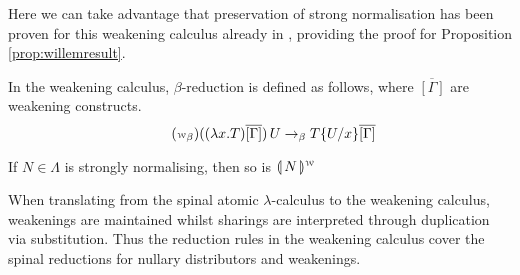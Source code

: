 \documentclass[a4paper,UKenglish,cleveref, autoref]{lipics-v2019}
\newcommand{\abs}[2]{\lambda #1 . #2}
\newcommand{\app}[2]{#1 \, #2}
\newcommand{\sub}[3]{#1 \{ #2 / #3 \}}
\newcommand{\weaksymbol}{\mbox{\tiny $\mathcal{W}$}}
\newcommand{\compweak}[1]{\llparenthesis \, #1 \, \rrparenthesis^{\weaksymbol}}
\begin{document}
\noindent Here we can take advantage that preservation of strong normalisation has been proven for this weakening calculus already in \cite{gundersen2013atomic}, providing the proof for Proposition \ref{prop:willemresult}. 
\begin{definition}
In the weakening calculus, $\beta$-reduction is defined as follows, where $\overline{[\Gamma]}$ are weakening constructs.
\begin{equation}
\tag{$\weaksymbol_{\beta}$}
	\app{((\abs{x}{T}) \overline{[\Gamma]})}{U} \rightarrow_{\beta} \sub{T}{U}{x} \overline{[\Gamma]} \\
\end{equation}
\end{definition}

\begin{proposition}
\label{prop:willemresult}
 If $N \in \Lambda$ is strongly normalising, then so is $\compweak{N}$
\end{proposition}

When translating from the spinal atomic $\lambda$-calculus to the weakening calculus, weakenings are maintained whilst sharings are interpreted through duplication via substitution. Thus the reduction rules in the weakening calculus cover the spinal reductions for nullary distributors and weakenings.
\end{document}
